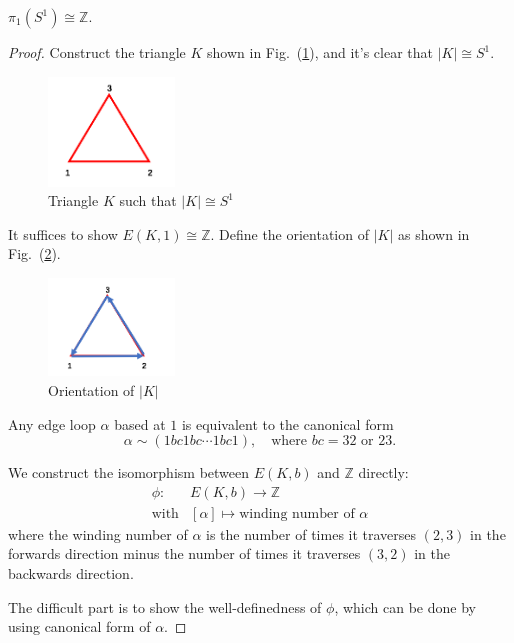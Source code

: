 \begin{theorem}
$\pi_1(S^1)\cong\mathbb{Z}$.
\end{theorem}
\begin{proof}
Construct the triangle $K$ shown in Fig.~(\ref{fig:13:6}), and it's clear that $|K|\cong S^1$.
\begin{figure}[H]
\centering
\includegraphics[width=0.3\textwidth]{week13/f_29}
\caption{Triangle $K$ such that $|K|\cong S^1$
} 
\label{fig:13:6}
\end{figure}
It suffices to show $E(K,1)\cong\mathbb{Z}$.
Define the orientation of $|K|$ as shown in Fig.~(\ref{fig:13:7}).
\begin{figure}[H]
\centering
\includegraphics[width=0.3\textwidth]{week13/f_30}
\caption{Orientation of $|K|$
} 
\label{fig:13:7}
\end{figure}
Any edge loop $\alpha$ based at $1$ is equivalent to the canonical form
\[
\alpha\sim(1bc1bc\cdots 1bc1),\quad
\text{where $bc=32$ or $23$.}
\]

We construct the isomorphism between $E(K,b)$ and $\mathbb{Z}$ directly:
\[
\begin{array}{ll}
\phi:&E(K,b)\to\mathbb{Z}\\
\text{with}&[\alpha]\mapsto\text{winding number of $\alpha$}
\end{array}
\]
where the winding number of $\alpha$ is the number of times it traverses $(2,3)$ in the forwards direction minus the number of times it traverses $(3,2)$ in the backwards direction.

The difficult part is to show the well-definedness of $\phi$, which can be done by using canonical form of $\alpha$.
\end{proof}













